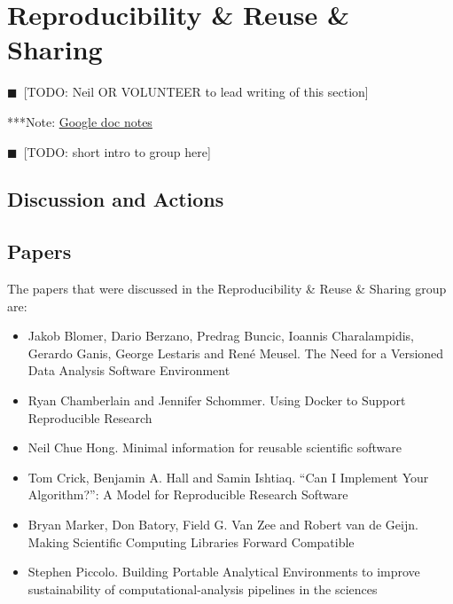 \documentclass[11pt, oneside]{amsart}
\newcommand{\todo}[1]{{\color{blue}$\blacksquare$~\textsf{[TODO: #1]}}}
\newcommand{\note}[1]{ {\textcolor{blueish}    { ***Note:      #1 }}}
\begin{document}
\section{Reproducibility \& Reuse \& Sharing} \label{sec:reproduce}
\todo{Neil OR VOLUNTEER to lead writing of this section}

\note{\href{http://tinyurl.com/kqpe87z}{Google doc notes}}

\todo{short intro to group here}

\subsection{Discussion and Actions}

\subsection{Papers}
The papers that were discussed in the Reproducibility \& Reuse \& Sharing group are:
\begin{itemize}
\item Jakob Blomer, Dario Berzano, Predrag Buncic, Ioannis Charalampidis,
Gerardo Ganis, George Lestaris and Ren\'{e} Meusel. The Need for a Versioned
Data Analysis Software Environment~\cite{wssspe2_blomer}

\item Ryan Chamberlain and Jennifer Schommer. Using {Docker} to Support
Reproducible Research~\cite{wssspe2_chamberlain}

\item Neil Chue Hong. Minimal information for reusable scientific
software~\cite{wssspe2_chue_hong}

\item Tom Crick, Benjamin A. Hall and Samin Ishtiaq. ``Can I Implement Your
Algorithm?'': A Model for Reproducible Research Software~\cite{wssspe2_crick}

\item Bryan Marker, Don Batory, Field G. Van Zee and Robert van de Geijn. Making
Scientific Computing Libraries Forward Compatible~\cite{wssspe2_marker}

\item Stephen Piccolo. Building Portable Analytical Environments to improve
sustainability of computational-analysis pipelines in the
sciences~\cite{wssspe2_piccolo}
\end{itemize}
\end{document}
